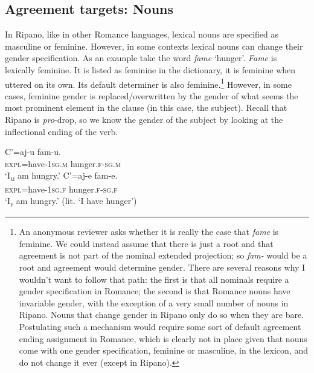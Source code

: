 \documentclass[output=paper
,modfonts
,nonflat]{langsci/langscibook}
\begin{document}
\subsection{Agreement targets: Nouns} \label{sec-dalessandro:1.4}
In Ripano, like in other Romance languages, lexical nouns are specified as masculine or feminine. However, in some contexts lexical nouns can change their gender specification. As an example take the word \textit{fame} ‘hunger’. \textit{Fame} is lexically feminine. It is listed as feminine in the dictionary, it is feminine when uttered on its own. Its default determiner is also feminine.\footnote{An anonymous reviewer asks whether it is really the case that \textit{fame} is feminine. We could instead assume that there is just a root and that agreement is not part of the nominal extended projection; so \textit{fam-} would be a root and agreement would determine gender. There are several reasons why I wouldn’t want to follow that path: the first is that all nominals require a gender specification in Romance; the second is that Romance nouns have invariable gender, with the exception of a very small number of nouns in Ripano. Nouns that change gender in Ripano only do so when they are bare. Postulating such a mechanism would require some sort of default agreement ending assignment in Romance, which is clearly not in place given that nouns come with one gender specification, feminine or masculine, in the lexicon, and do not change it ever (except in Ripano).} 
However, in some cases, feminine gender is replaced/overwritten by the gender of what seems the most prominent element in the clause (in this case, the subject). Recall that Ripano is \textit{pro}-drop, so we know the gender of the subject by looking at the inflectional ending of the verb.

\begin{exe}
	\ex \label{ex-dalessandro:8}\xlist
	\ex 
	\gll C’\footnotemark=aj-u     fam-u. \\
	\textsc{expl}=have-\textsc{1sg.m} hunger.\textsc{f-sg.m}\\
	\glt `I\textsc{\textsubscript{m}} am hungry.' 
	\ex
	\gll  C’=aj-e    fam-e.\\
	\textsc{expl}=have-\textsc{1sg.f} hunger.\textsc{f-sg.f}\\
	\glt `I\textsc{\textsubscript{f}} am hungry.' (lit. `I have hunger')
	\endxlist
\end{exe}
\end{document}
